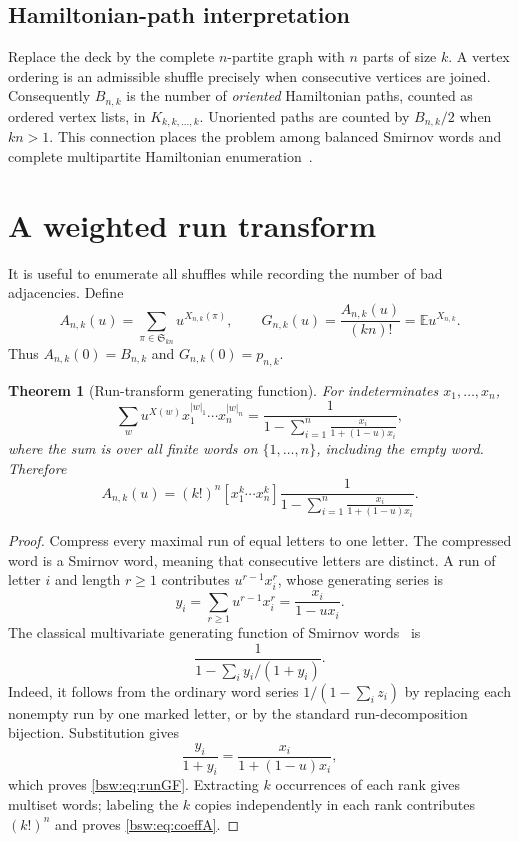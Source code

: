 \documentclass[11pt,letterpaper]{article}
\newtheorem{theorem}{Theorem}[section]
\theoremstyle{definition}
\theoremstyle{remark}
\newcommand{\EE}{\mathbb E}
\newcommand{\coef}[2]{[#1]#2}
\begin{document}
\subsection{Hamiltonian-path interpretation}

Replace the deck by the complete $n$-partite graph with $n$ parts of size
$k$.  A vertex ordering is an admissible shuffle precisely when consecutive
vertices are joined.  Consequently $B_{n,k}$ is the number of \emph{oriented}
Hamiltonian paths, counted as ordered vertex lists, in
$K_{k,k,\ldots,k}$.  Unoriented paths are counted by $B_{n,k}/2$ when
$kn>1$.  This connection places the problem among balanced Smirnov words and
complete multipartite Hamiltonian enumeration~\cite{eriksson-martin,mehiri}.

\section{A weighted run transform}

It is useful to enumerate all shuffles while recording the number of bad
adjacencies.  Define
\begin{equation}\label{bsw:eq:weightedA}
 A_{n,k}(u)=\sum_{\pi\in\mathfrak S_{kn}}u^{X_{n,k}(\pi)},
 \qquad
 G_{n,k}(u)=\frac{A_{n,k}(u)}{(kn)!}=\EE u^{X_{n,k}}.
\end{equation}
Thus $A_{n,k}(0)=B_{n,k}$ and $G_{n,k}(0)=p_{n,k}$.

\begin{theorem}[Run-transform generating function]\label{bsw:thm:run-transform}
For indeterminates $x_1,\ldots,x_n$,
\begin{equation}\label{bsw:eq:runGF}
 \sum_{w}u^{X(w)}x_1^{|w|_1}\cdots x_n^{|w|_n}
 =\frac{1}{1-\displaystyle\sum_{i=1}^n
             \frac{x_i}{1+(1-u)x_i}},
\end{equation}
where the sum is over all finite words on $\{1,\ldots,n\}$, including the
empty word.  Therefore
\begin{equation}\label{bsw:eq:coeffA}
 A_{n,k}(u)=(k!)^n\coef{x_1^k\cdots x_n^k}
 \frac{1}{1-\displaystyle\sum_{i=1}^n
             \frac{x_i}{1+(1-u)x_i}}.
\end{equation}
\end{theorem}

\begin{proof}
Compress every maximal run of equal letters to one letter.  The compressed
word is a Smirnov word, meaning that consecutive letters are distinct.  A run
of letter $i$ and length $r\ge1$ contributes
$u^{r-1}x_i^r$, whose generating series is
\[
 y_i=\sum_{r\ge1}u^{r-1}x_i^r=\frac{x_i}{1-ux_i}.
\]
The classical multivariate generating function of Smirnov
words~\cite{stanley,flajolet-sedgewick} is
\[
 \frac{1}{1-\sum_i y_i/(1+y_i)}.
\]
Indeed, it follows from the ordinary word series
$1/(1-\sum_i z_i)$ by replacing each nonempty run by one marked letter, or
by the standard run-decomposition bijection.  Substitution gives
\[
 \frac{y_i}{1+y_i}=\frac{x_i}{1+(1-u)x_i},
\]
which proves \eqref{bsw:eq:runGF}.  Extracting $k$ occurrences of each rank gives
multiset words; labeling the $k$ copies independently in each rank contributes
$(k!)^n$ and proves \eqref{bsw:eq:coeffA}.
\end{proof}
\end{document}
